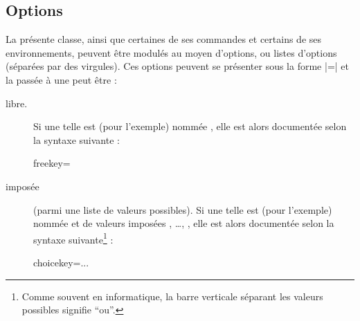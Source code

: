 \documentclass[french,nolocaltoc]{nwejmart}
\newtheorem[style=definition]{fait}
\newtheorem[title=expérience]{experience}
\newtheorem[title-plural=anneaux]{anneau}
\newtheorem[title=idéal,title-plural=idéaux]{ideal}
\begin{document}
\subsection{Options}
\label{sec-options}

La présente classe, ainsi que certaines de ses commandes et certains de ses
environnements, peuvent être modulés au moyen d'options, ou listes d'options
(séparées par des virgules). Ces options peuvent se présenter sous la forme
|=| et la  passée à une  peut
être :
\begin{description}
\item[libre.] Si une telle  est (pour l'exemple) nommée
  , elle est alors documentée selon la syntaxe suivante :
  \begin{docKey*}{freekey}{=}{}
  \end{docKey*}
\item[imposée] (parmi une liste de valeurs possibles). Si une telle  est
   (pour l'exemple) nommée  et de valeurs imposées
  , \dots{}, , elle est alors
  documentée selon la syntaxe suivante\footnote{Comme souvent en informatique,
    la barre verticale séparant les valeurs possibles signifie \enquote{ou}.} :
  \begin{docKey*}{choicekey}{=\textbar...\textbar{}}{}
  \end{docKey*}
\end{description}
\end{document}
